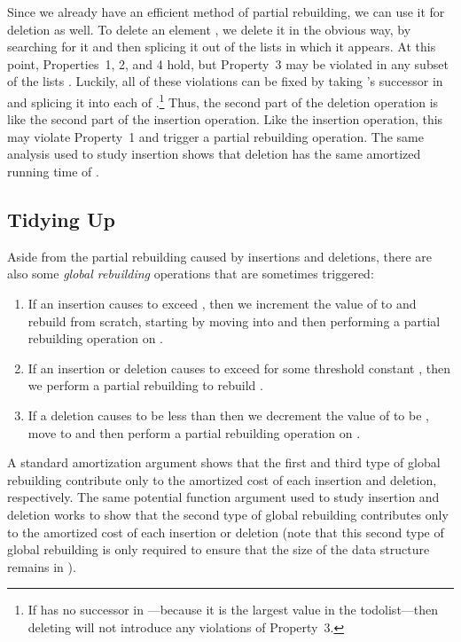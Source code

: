 \documentclass{patmorin}
\begin{document}
Since we already have an efficient method of partial rebuilding, we
can use it for deletion as well. To delete an element , we delete
it in the obvious way, by searching for it and then splicing it out
of the lists  in which it appears.  At this point,
Properties~1, 2, and 4 hold, but Property~3 may be violated in any
subset of the lists .  Luckily, all of these violations
can be fixed by taking 's successor in  and splicing it into
each of .\footnote{If  has no successor in
---because it is the largest value in the todolist---then deleting
 will not introduce any violations of Property~3.}  Thus, the second
part of the deletion operation is like the second part of the insertion
operation.  Like the insertion operation, this may violate Property~1
and trigger a partial rebuilding operation.  The same analysis used to
study insertion shows that deletion has the same amortized running time
of .

\subsection{Tidying Up}

Aside from the partial rebuilding caused by insertions and deletions,
there are also some \emph{global rebuilding} operations that are sometimes
triggered:
\begin{enumerate}
\item If an insertion causes  to exceed , then
we increment the value of  to  and rebuild 
from scratch, starting by moving  into  and then performing
a partial rebuilding operation on .
\item If an insertion or deletion causes  to exceed  for some threshold constant , then we perform a partial rebuilding to rebuild .
\item If a deletion causes  to be less than  then we decrement the value of  to be , move  to  and then perform a partial rebuilding operation on . 
\end{enumerate}

A standard amortization argument shows that the first and third type
of global rebuilding contribute only  to the amortized cost of
each insertion and deletion, respectively.  The same potential function
argument used to study insertion and deletion works to show that the
second type of global rebuilding contributes only  to the
amortized cost of each insertion or deletion (note that this second
type of global rebuilding is only required to ensure that the size of
the data structure remains in ).
\end{document}
